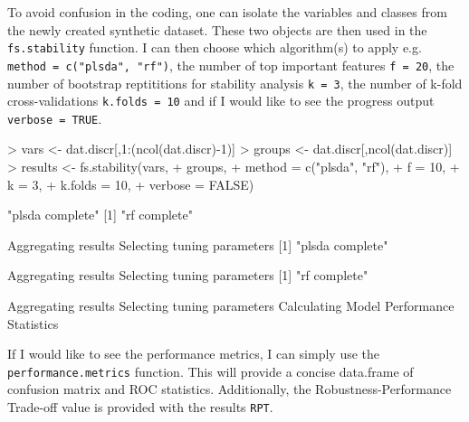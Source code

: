 \documentclass[12pt]{article}
\renewenvironment{Schunk}{\vspace{\topsep}}{\vspace{\topsep}}
\begin{document}
\begin{Schunk}
\end{Schunk}

To avoid confusion in the coding, one can isolate the variables and classes from the newly created synthetic dataset.  These two objects are then used in the {\tt fs.stability} function.  I can then choose which algorithm(s) to apply e.g. {\tt method = c("plsda", "rf")}, the number of top important features {\tt f = 20}, the number of bootstrap reptititions for stability analysis {\tt k = 3}, the number of k-fold cross-validations {\tt k.folds = 10} and if I would like to see the progress output {\tt verbose = TRUE}.

\begin{Schunk}
\begin{Sinput}
> vars <- dat.discr[,1:(ncol(dat.discr)-1)]
> groups <- dat.discr[,ncol(dat.discr)]
> results <- fs.stability(vars, 
+                         groups, 
+                         method = c("plsda", "rf"), 
+                         f = 10, 
+                         k = 3, 
+                         k.folds = 10, 
+                         verbose = FALSE)
\end{Sinput}
\begin{Soutput}
[1] "plsda complete"
[1] "rf complete"

Aggregating results
Selecting tuning parameters
[1] "plsda complete"

Aggregating results
Selecting tuning parameters
[1] "rf complete"

Aggregating results
Selecting tuning parameters
Calculating Model Performance Statistics
\end{Soutput}
\end{Schunk}

If I would like to see the performance metrics, I can simply use the {\tt performance.metrics} function.  This will provide a concise data.frame of confusion matrix and ROC statistics.  Additionally, the Robustness-Performance Trade-off value is provided with the results {\tt RPT}.
\end{document}

